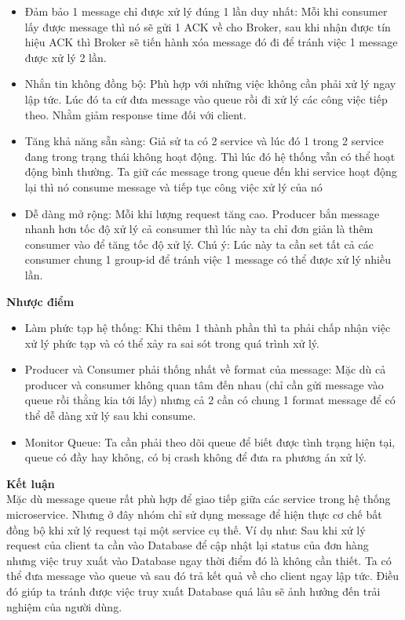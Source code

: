             \begin{itemize}
                \item Đảm bảo 1 message chỉ được xử lý đúng 1 lần duy nhất: Mỗi khi consumer lấy được message thì nó sẽ gửi 1 ACK về cho Broker, sau khi nhận được tín hiệu ACK thì Broker sẽ tiến hành xóa message đó đi để tránh việc 1 message được xử lý 2 lần.
                \item Nhắn tin không đồng bộ: Phù hợp với những việc không cần phải xử lý ngay lập tức. Lúc đó ta cứ đưa message vào queue rồi đi xử lý các công việc tiếp theo. Nhằm giảm response time đối với client.
                \item Tăng khả năng sẵn sàng: Giả sử ta có 2 service và lúc đó 1 trong 2 service đang trong trạng thái không hoạt động. Thì lúc đó hệ thống vẫn có thể hoạt động bình thường. Ta giữ các message trong queue đến khi service hoạt động lại thì nó consume message và tiếp tục công việc xử lý của nó
                \item Dễ dàng mở rộng: Mỗi khi lượng request tăng cao. Producer bắn message nhanh hơn tốc độ xử lý cả consumer thì lúc này ta chỉ đơn giản là thêm consumer vào để tăng tốc độ xử lý. Chú ý: Lúc này ta cần set tất cả các consumer chung 1 group-id để tránh việc 1 message có thể được xử lý nhiều lần.
            \end{itemize}
            
            \textbf{Nhược điểm}
            
            \begin{itemize}
                \item Làm phức tạp hệ thống: Khi thêm 1 thành phần thì ta phải chấp nhận việc xử lý phức tạp và có thể xảy ra sai sót trong quá trình xử lý.
                \item Producer và Consumer phải thống nhất về format của message: Mặc dù cả producer và consumer không quan tâm đến nhau (chỉ cần gửi message vào queue rồi thằng kia tới lấy) nhưng cả 2 cần có chung 1 format message để có thể dễ dàng xử lý sau khi consume.
                \item Monitor Queue: Ta cần phải theo dõi queue để biết được tình trạng hiện tại, queue có đầy hay không, có bị crash không để đưa ra phương án xử lý.
            \end{itemize}
            
            \textbf{Kết luận}\\
            
            Mặc dù message queue rất phù hợp để giao tiếp giữa các service trong hệ thống microservice. Nhưng ở đây nhóm chỉ sử dụng message để hiện thực cơ chế bất đồng bộ khi xử lý request tại một service cụ thế. Ví dụ như: Sau khi xử lý request của client ta cần vào Database để cập nhật lại status của đơn hàng nhưng việc truy xuất vào Database ngay thời điểm đó là không cần thiết. Ta có thể đưa message vào queue và sau đó trả kết quả về cho client ngay lập tức. Điều đó giúp ta tránh được việc truy xuất Database quá lâu sẽ ảnh hưởng đến trải nghiệm của người dùng.
            
